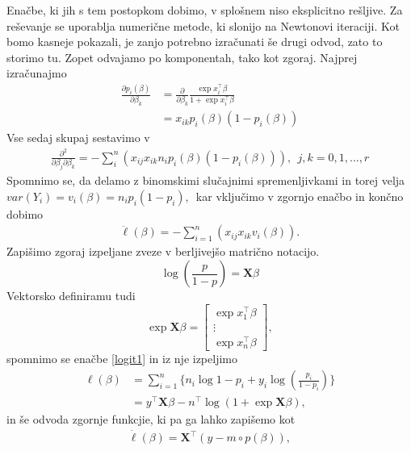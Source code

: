 \documentclass[12pt,a4paper]{amsart}
\theoremstyle{definition} %
\theoremstyle{plain} %
\begin{document}
Enačbe, ki jih s tem postopkom dobimo, v splošnem niso eksplicitno rešljive. Za reševanje se uporablja numerične metode, ki slonijo na Newtonovi iteraciji. Kot
bomo kasneje pokazali, je zanjo potrebno izračunati še drugi odvod, zato to storimo tu. Zopet odvajamo po komponentah, tako kot zgoraj. Najprej izračunajmo
\begin{align}
    \frac{\partial p_{i}(\beta)}{\partial \beta_{k}} &= \frac{\partial}{\partial \beta_{k}} \frac{\exp{x_{i}^\top\beta}}{1+\exp{x_{i}^\top\beta}} \nonumber \\
        &= x_{ik}p_{i}(\beta)(1 - p_{i}(\beta)) \nonumber
\end{align}
Vse sedaj skupaj sestavimo v
\begin{align}
    \frac{\partial^2}{\partial \beta_{j}\partial\beta_{k}} = - \sum_{i}^{n}\left(x_{ij}x_{ik}n_{i}p_{i}(\beta)(1-p_{i}(\beta))\right),~~j,k = 0,1,\ldots, r
\end{align}
Spomnimo se, da delamo z binomskimi slučajnimi spremenljivkami in torej velja $var(Y_{i}) = v_{i}(\beta) = n_{i}p_{i}(1-p_{i}),$~kar vključimo v zgornjo enačbo in končno dobimo
\begin{align}
    \ddot{\ell}(\beta) = -\sum_{i=1}^{n}\left(x_{ij}x_{ik}v_{i}(\beta)\right).
\end{align}
Zapišimo zgoraj izpeljane zveze v berljivejšo matrično notacijo. 
\begin{equation*}
    \log \left(\frac{p}{1-p}\right) = \mathbf{X}\beta
\end{equation*}
Vektorsko definiramu tudi
\[
    \exp{\mathbf{X}\beta} = \begin{bmatrix}
                            \exp{x_{1}^\top\beta} \\
                            \vdots\\
                            \exp{x_{n}^\top\beta}
                            \end{bmatrix},
\]
spomnimo se enačbe \eqref{logit1} in iz nje izpeljimo
\begin{align} \label{ell}
    \ell(\beta) &= \sum_{i=1}^{n}\{n_{i}\log{1-p_{i}}  + y_{i}\log{\left(\frac{p_{i}}{1-p_{i}}\right)}\} \nonumber\\
    &= y^\top\mathbf{X}\beta - n^\top \log(1 + \exp{\mathbf{X}\beta}),
\end{align}
in še odvoda zgornje funkcjie, ki pa ga lahko zapišemo kot
\begin{align}
    \dot{\ell}(\beta) = \mathbf{X}^\top(y - m\circ p(\beta)),
\end{align}
\end{document}
